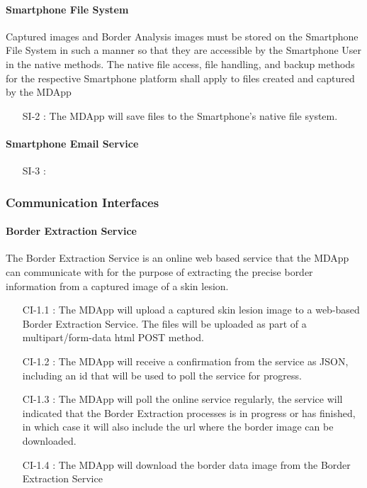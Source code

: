     \paragraph{Smartphone File System}

        Captured images and Border Analysis images must be stored on the Smartphone File System in such a manner so that they are accessible by the Smartphone User in the native methods. The native file access, file handling, and backup methods for the respective Smartphone platform shall apply to files created and captured by the MDApp

        \begin{itemize}[leftmargin=1.4cm]
            \item[SI-2 :] The MDApp will save files to the Smartphone's native file system.

        \end{itemize}

    \paragraph{Smartphone Email Service}

            \begin{itemize}[leftmargin=1.4cm]
            \item[SI-3 :]

        \end{itemize}

\subsubsection{Communication Interfaces}

    \paragraph{Border Extraction Service }

        The Border Extraction Service is an online web based service that the MDApp can communicate with for the purpose of extracting the precise border information from a captured image of a skin lesion.

        \begin{itemize}[leftmargin=1.4cm]
            \item[CI-1.1 :] The MDApp will upload a captured skin lesion image to a web-based Border Extraction Service. The files will be uploaded as part of a multipart/form-data html POST method.
            \item[CI-1.2 :] The MDApp will receive a confirmation from the service as JSON, including an id that will be used to poll the service for progress.
            \item[CI-1.3 :] The MDApp will poll the online service regularly, the service will indicated that the Border Extraction processes is in progress or has finished, in which case it will also include the url where the border image can be downloaded.
            \item[CI-1.4 : ] The MDApp will download the border data image from the Border Extraction Service

        \end{itemize}

